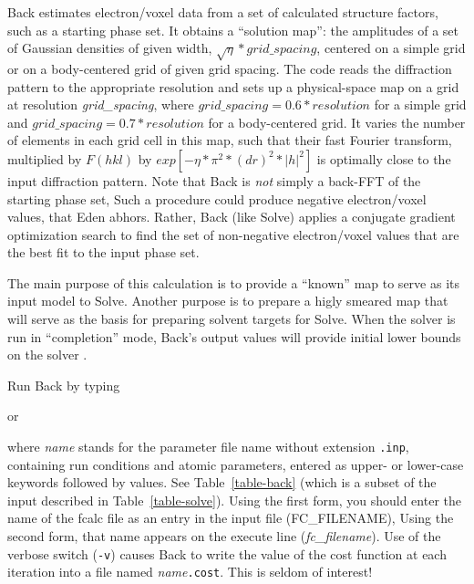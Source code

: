\documentclass{report}
\begin{document}
{
Back estimates electron/voxel data from a set of
calculated structure factors, such as a starting phase set. It obtains
a ``solution map'': the amplitudes of a set of
Gaussian densities of given width, $\sqrt{\eta}*grid\_spacing$,
centered on a simple grid or on a body-centered
grid of given grid spacing. 
The code reads the diffraction pattern to the appropriate
resolution and sets up a physical-space map on a grid
at resolution {\it grid\_spacing}, where
$grid\_spacing = 0.6 * resolution$ for a simple grid and
$grid\_spacing = 0.7 * resolution$ for a body-centered grid.
It varies the number of elements in each grid cell in this map, such that
their fast Fourier transform, multiplied by
$F(h k l)$ by $exp[-\eta*\pi^2*(dr)^2*|h|^2]$
is optimally close to the input diffraction pattern.
Note that Back is {\em not} simply a back-FFT of the starting phase set, 
Such a procedure could produce negative electron/voxel values, that
Eden abhors.  Rather, Back (like Solve) 
applies a conjugate gradient 
optimization search to find the set of non-negative electron/voxel values 
that are the best fit to the input phase set.

\vspace {0.1in}

The main purpose of this calculation is to provide 
a ``known'' map to serve as its input model to Solve. 
Another purpose is to prepare a higly smeared map that will serve
as the basis for preparing solvent targets for Solve.
When the solver is run in ``completion'' mode, Back's output values 
will provide initial lower bounds on the solver .

\vspace {0.1in}

Run Back by typing


or

   
where {\it name} stands for the parameter file name without extension 
{\tt .inp}, containing run conditions and atomic parameters, 
entered as upper- or lower-case keywords followed by values.  
See Table~\ref{table-back} (which is a subset of the input described in 
Table~\ref{table-solve}).  Using the first form, you should enter the name
of the fcalc file as an entry in the input file (FC\_FILENAME),  Using the second 
form, that name appears on the execute line ({\it fc\_filename}).
Use of the verbose switch ({\tt -v}) causes
Back to write the value of the cost function at each iteration into a file
named {\it name}{\tt .cost}.  This is seldom of interest!

}
\end{document}
